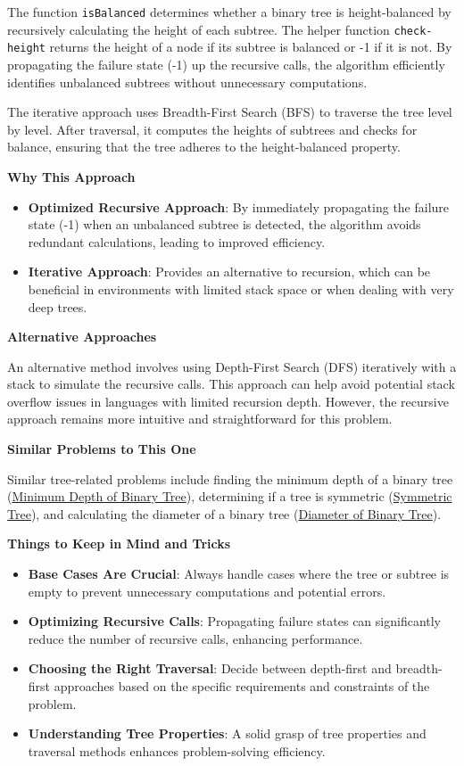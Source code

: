 The function \texttt{isBalanced} determines whether a binary tree is height-balanced by recursively calculating the height of each subtree. The helper function \texttt{check-height} returns the height of a node if its subtree is balanced or -1 if it is not. By propagating the failure state (-1) up the recursive calls, the algorithm efficiently identifies unbalanced subtrees without unnecessary computations.

The iterative approach uses Breadth-First Search (BFS) to traverse the tree level by level. After traversal, it computes the heights of subtrees and checks for balance, ensuring that the tree adheres to the height-balanced property.

\textbf{Why This Approach}

\begin{itemize}
    \item \textbf{Optimized Recursive Approach}: By immediately propagating the failure state (-1) when an unbalanced subtree is detected, the algorithm avoids redundant calculations, leading to improved efficiency.
    \item \textbf{Iterative Approach}: Provides an alternative to recursion, which can be beneficial in environments with limited stack space or when dealing with very deep trees.
\end{itemize}

\textbf{Alternative Approaches}

An alternative method involves using Depth-First Search (DFS) iteratively with a stack to simulate the recursive calls. This approach can help avoid potential stack overflow issues in languages with limited recursion depth. However, the recursive approach remains more intuitive and straightforward for this problem.

\textbf{Similar Problems to This One}

Similar tree-related problems include finding the minimum depth of a binary tree (\hyperref[problem:minimum_depth_of_binary_tree]{Minimum Depth of Binary Tree}), determining if a tree is symmetric (\hyperref[problem:symmetric_tree]{Symmetric Tree}), and calculating the diameter of a binary tree (\hyperref[problem:diameter_of_binary_tree]{Diameter of Binary Tree}).

\textbf{Things to Keep in Mind and Tricks}

\begin{itemize}
    \item \textbf{Base Cases Are Crucial}: Always handle cases where the tree or subtree is empty to prevent unnecessary computations and potential errors.
    \item \textbf{Optimizing Recursive Calls}: Propagating failure states can significantly reduce the number of recursive calls, enhancing performance.
    \item \textbf{Choosing the Right Traversal}: Decide between depth-first and breadth-first approaches based on the specific requirements and constraints of the problem.
    \item \textbf{Understanding Tree Properties}: A solid grasp of tree properties and traversal methods enhances problem-solving efficiency.
\end{itemize}


